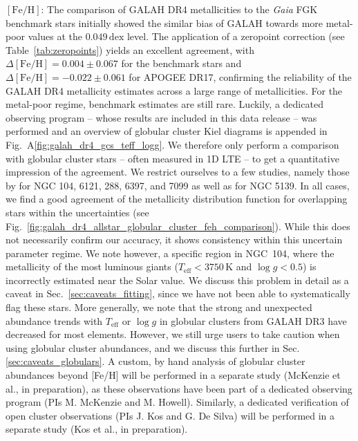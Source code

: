 \documentclass[
  journal=pasa,
  manuscript=research-paper, %
  year=2024,
  volume=37
]{cup-journal}
\newcommand{\Teff}{$T_\mathrm{eff}$\xspace}
\newcommand{\logg}{$\log g$\xspace}
\newcommand{\feh}{$\mathrm{[Fe/H]}$\xspace}
\newcommand{\Gaia}{\textit{Gaia}\xspace}
\begin{document}
\feh: The comparison of GALAH DR4 metallicities to the \Gaia FGK benchmark stars initially showed the similar bias of GALAH towards more metal-poor values at the $0.049\,\mathrm{dex}$ level. The application of a zeropoint correction (see Table~\ref{tab:zeropoints}) yields an excellent agreement, with $\Delta \mathrm{[Fe/H]} = 0.004 \pm 0.067$ for the benchmark stars and $\Delta \mathrm{[Fe/H]} = -0.022 \pm 0.061$ for APOGEE DR17, confirming the reliability of the GALAH DR4 metallicity estimates across a large range of metallicities. For the metal-poor regime, benchmark estimates are still rare. Luckily, a dedicated observing program -- whose results are included in this data release -- was performed and an overview of globular cluster Kiel diagrams is appended in Fig.~A\ref{fig:galah_dr4_gcs_teff_logg}. We therefore only perform a comparison with globular cluster stars -- often measured in 1D LTE -- to get a quantitative impression of the agreement. We restrict ourselves to a few studies, namely those by \citet{ Carretta2009c, Carretta2009} for NGC 104, 6121, 288, 6397, and 7099 as well as \citet{Johnson2010} for NGC 5139. In all cases, we find a good agreement of the metallicity distribution function for overlapping stars within the uncertainties (see Fig.~\ref{fig:galah_dr4_allstar_globular_cluster_feh_comparison}). While this does not necessarily confirm our accuracy, it shows consistency within this uncertain parameter regime. We note however, a specific region in NGC~104, where the metallicity of the most luminous giants ($T_\mathrm{eff} < 3750\,\mathrm{K}$ and $\log g < 0.5$) is incorrectly estimated near the Solar value. We discuss this problem in detail as a caveat in Sec.~\ref{sec:caveats_fitting}, since we have not been able to systematically flag these stars. More generally, we note that the strong and unexpected abundance trends with \Teff or \logg in globular clusters from GALAH DR3 have decreased for most elements. However, we still urge users to take caution when using globular cluster abundances, and we discuss this further in Sec. \ref{sec:caveats_globulars}. A custom, by hand analysis of globular cluster abundances beyond [Fe/H] will be performed in a separate study (McKenzie et al., in preparation), as these observations have been part of a dedicated observing program (PIs M. McKenzie and M. Howell). Similarly, a dedicated verification of open cluster observations (PIs J. Kos and G. De Silva) will be performed in a separate study (Kos et al., in preparation).
\end{document}
